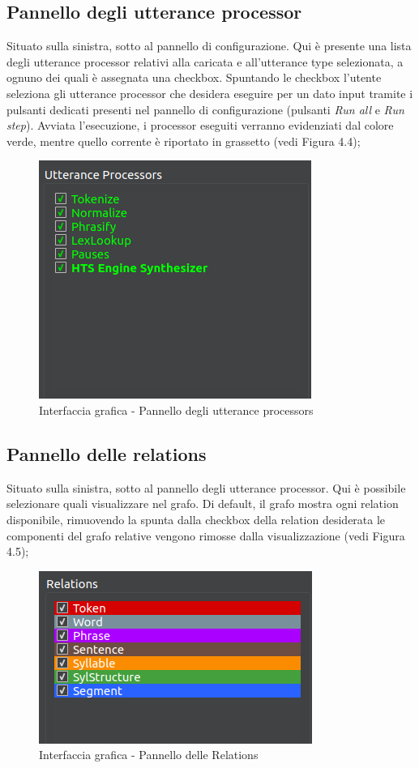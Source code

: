 \documentclass[openany,12pt,a4paper]{report}
\begin{document}
 	\subsection{Pannello degli utterance processor}
 	Situato sulla sinistra, sotto al pannello di configurazione. Qui è presente una lista degli utterance processor relativi alla  caricata e all'utterance type selezionata, a ognuno dei quali è assegnata una checkbox. Spuntando le checkbox l'utente seleziona gli utterance processor che desidera eseguire per un dato input tramite i pulsanti dedicati presenti nel pannello di configurazione (pulsanti \textit{Run all} e \textit{Run step}). Avviata l'esecuzione, i processor eseguiti verranno evidenziati dal colore verde, mentre quello corrente è riportato in grassetto (vedi Figura 4.4);
 		\begin{figure}[H]
 			
 			\centering
 			
 				\includegraphics[width=.4\textwidth]{./img/utterance-processors}
 			
 			\caption{Interfaccia grafica - Pannello degli utterance processors}
 			
 		\end{figure}
 		
 	\subsection{Pannello delle relations}
 	Situato sulla sinistra, sotto al pannello degli utterance processor. Qui è possibile selezionare quali  visualizzare nel grafo. Di default, il grafo mostra ogni relation disponibile, rimuovendo la spunta dalla checkbox della relation desiderata le componenti del grafo relative vengono rimosse dalla visualizzazione (vedi Figura 4.5);
 		\begin{figure}[H]
 			
 			\centering
 			
 				\includegraphics[width=.4\textwidth]{./img/relations}
 			
 			\caption{Interfaccia grafica - Pannello delle Relations}
 			
 		\end{figure}
 	
\end{document}

